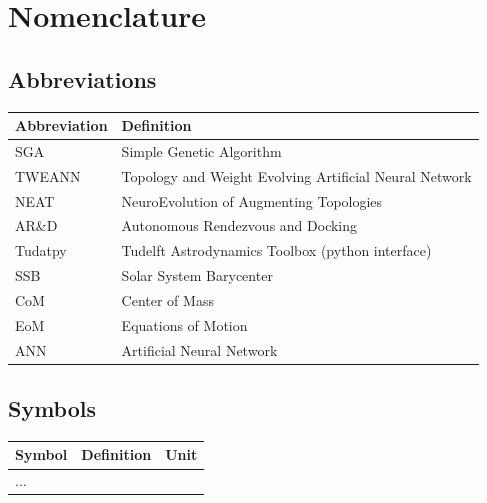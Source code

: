 \chapter*{Nomenclature}

\section*{Abbreviations}

\begin{longtable}{p{3cm}p{\dimexpr\textwidth-3cm-2\tabcolsep\relax}}
    
    \toprule
    Abbreviation & Definition \\
    \midrule\endhead %
    SGA & Simple Genetic Algorithm \\
    TWEANN & Topology and Weight Evolving Artificial Neural Network \\
    NEAT & NeuroEvolution of Augmenting Topologies \\
    AR\&D & Autonomous Rendezvous and Docking \\
    Tudatpy & Tudelft Astrodynamics Toolbox (python interface)\\
    SSB & Solar System Barycenter \\
    CoM & Center of Mass \\
    EoM & Equations of Motion \\
    ANN & Artificial Neural Network \\
    \bottomrule
\end{longtable}


\section*{Symbols}

\begin{longtable}{p{3cm}p{\dimexpr\textwidth-5.5cm-4\tabcolsep\relax}p{2.5cm}}
    \toprule
    Symbol & Definition & Unit \\
    \midrule\endhead %
    ... \\
    \bottomrule
\end{longtable}
